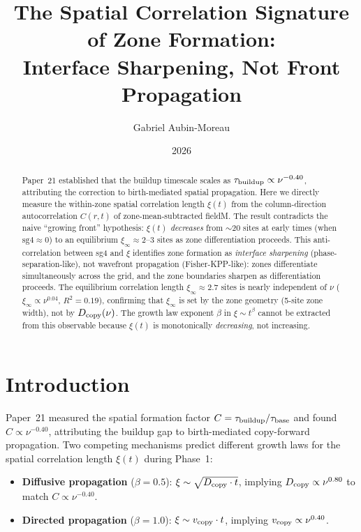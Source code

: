 \documentclass[11pt]{article}
\title{The Spatial Correlation Signature of Zone Formation:\\
       Interface Sharpening, Not Front Propagation}
\author{Gabriel Aubin-Moreau}
\date{2026}
\begin{document}
\maketitle

\begin{abstract}
Paper~21 established that the buildup timescale scales as
$\tau_{\rm buildup} \propto \nu^{-0.40}$, attributing the correction to
birth-mediated spatial propagation.
Here we directly measure the within-zone spatial correlation length $\xi(t)$
from the column-direction autocorrelation $C(r,t)$ of zone-mean-subtracted fieldM.
The result contradicts the naive ``growing front'' hypothesis:
$\xi(t)$ \emph{decreases} from ${\sim}20$ sites at early times (when $\mathrm{sg4}\approx 0$)
to an equilibrium $\xi_\infty \approx 2$--$3$ sites as zone differentiation proceeds.
This anti-correlation between sg4 and $\xi$ identifies zone formation as
\emph{interface sharpening} (phase-separation-like), not wavefront propagation
(Fisher-KPP-like): zones differentiate simultaneously across the grid,
and the zone boundaries sharpen as differentiation proceeds.
The equilibrium correlation length $\xi_\infty \approx 2.7$ sites is
nearly independent of $\nu$ ($\xi_\infty \propto \nu^{0.04}$, $R^2=0.19$),
confirming that $\xi_\infty$ is set by the zone geometry (5-site zone width),
not by $D_{\rm copy}(\nu)$.
The growth law exponent $\beta$ in $\xi \sim t^\beta$ cannot be extracted
from this observable because $\xi(t)$ is monotonically \emph{decreasing},
not increasing.
\end{abstract}

\section{Introduction}

Paper~21 measured the spatial formation factor $C = \tau_{\rm buildup}/\tau_{\rm base}$
and found $C \propto \nu^{-0.40}$, attributing the buildup gap to birth-mediated
copy-forward propagation.
Two competing mechanisms predict different growth laws for the spatial correlation
length $\xi(t)$ during Phase~1:
\begin{itemize}
  \item \textbf{Diffusive propagation} ($\beta = 0.5$): $\xi \sim \sqrt{D_{\rm copy} \cdot t}$,
    implying $D_{\rm copy} \propto \nu^{0.80}$ to match $C \propto \nu^{-0.40}$.
  \item \textbf{Directed propagation} ($\beta = 1.0$): $\xi \sim v_{\rm copy} \cdot t$,
    implying $v_{\rm copy} \propto \nu^{0.40}$.
\end{itemize}
\end{document}
